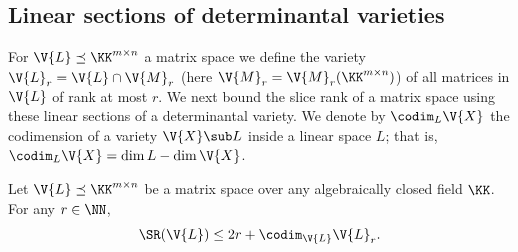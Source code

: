 \subsection{Linear sections of determinantal varieties}

For $\V{L} \preceq \KK^{m \times n}$ a matrix space we define the variety $\V{L}_r = \V{L} \cap \V{M}_{r}$ (here $\V{M}_{r}=\V{M}_{r}(\KK^{m \times n})$)
of all matrices in $\V{L}$ of rank at most $r$.
We next bound the slice rank of a matrix space using these linear sections of a determinantal variety. 
We denote by $\codim_L \V{X}$ the codimension of a variety $\V{X} \sub L$ inside a linear space $L$; that is, $\codim_L \V{X} = \dim L - \dim \V{X}$.

\begin{proposition}\label{theo:core}
Let $\V{L} \preceq \KK^{m \times n}$ be a matrix space over any algebraically closed field $\KK$. 
For any $r \in \NN$, 
$$\SR(\V{L}) \le 2r + \codim_\V{L} \V{L}_r.$$
\end{proposition}
